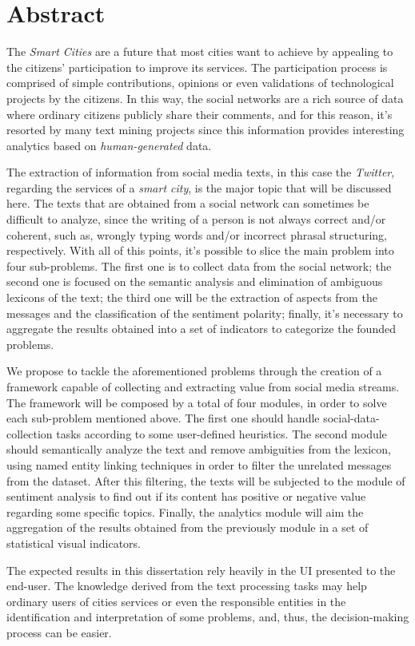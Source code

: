 \chapter*{Abstract}

The \textit{Smart Cities} are a future that most cities want to achieve by appealing to the citizens' participation to improve its services. The participation process is comprised of simple contributions, opinions or even validations of technological projects by the citizens. In this way, the social networks are a rich source of data where ordinary citizens publicly share their comments, and for this reason, it's resorted by many text mining projects since this information provides interesting analytics based on \textit{human-generated} data.

The extraction of information from social media texts, in this case the \textit{Twitter}, regarding the services of a \textit{smart city}, is the major topic that will be discussed here. The texts that are  obtained from a social network can sometimes be difficult to analyze, since the writing of a person is not always correct and/or coherent, such as, wrongly typing words and/or incorrect phrasal structuring, respectively. With all of this points, it's possible to slice the main problem into four sub-problems. The first one is to collect data from the social network; the second one is focused on the semantic analysis and elimination of ambiguous lexicons of the text; the third one will be the extraction of aspects from the messages and the classification of the sentiment polarity; finally, it's necessary to aggregate the results obtained into a set of indicators to categorize the founded problems.

We propose to tackle the aforementioned problems through the creation of a framework capable of collecting and extracting value from social media streams. The framework will be composed by a total of four modules, in order to solve each sub-problem mentioned above. The first one should handle social-data-collection tasks according to some user-defined heuristics. The second module should semantically analyze the text and remove ambiguities from the lexicon, using named entity linking techniques in order to filter the unrelated messages from the dataset. After this filtering, the texts will be subjected to the module of sentiment analysis to find out if its content has positive or negative value regarding some specific topics. Finally, the analytics module will aim the aggregation of the results obtained from the previously module in a set of statistical visual indicators.

The expected results in this dissertation rely heavily in the UI presented to the end-user. The knowledge derived from the text processing tasks may help ordinary users of cities services or even the responsible entities in the identification and interpretation of some problems, and, thus, the decision-making process can be easier.

